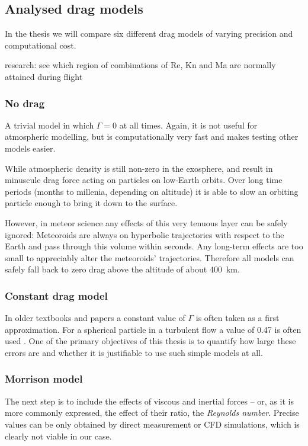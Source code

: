     \subsection{Analysed drag models} \label{fdm}
        In the thesis we will compare six different drag models of varying precision
        and computational cost.

        research: see which region of combinations of Re, Kn and Ma are normally attained during flight

        \subsubsection{No drag} \label{fdmn}
            A trivial model in which $\Gamma = 0$ at all times.
            Again, it is not useful for atmospheric modelling, but is computationally
            very fast and makes testing other models easier.

            While atmospheric density is still non-zero in the exosphere,
            and result in minuscule drag force acting on particles on low-Earth orbits.
            Over long time periods (months to millenia, depending on altitude) it is able to slow
            an orbiting particle enough to bring it down to the surface.

            However, in meteor science any effects of this very tenuous layer can be safely ignored:
            Meteoroids are always on hyperbolic trajectories with respect to the Earth
            and pass through this volume within seconds. Any long-term effects
            are too small to appreciably alter the meteoroids' trajectories.
            Therefore all models can safely fall back to zero drag above the
            altitude of about \SI{400}{\kilo\metre}.

        \subsubsection{Constant drag model} \label{fdmc}
            In older textbooks and papers a constant value of $\Gamma$ is often taken as a first approximation.
            For a spherical particle in a turbulent flow a value of \num{0.47} is often used \cite{???}.
            One of the primary objectives of this thesis is to quantify how large these errors
            are and whether it is justifiable to use such simple models at all.

        \subsubsection{Morrison model} \label{fdmM}
            The next step is to include the effects of viscous and inertial forces -- or,
            as it is more commonly expressed, the effect of their ratio, the \emph{Reynolds number}.
            Precise values can be only obtained by direct measurement or CFD simulations,
            which is clearly not viable in our case.

